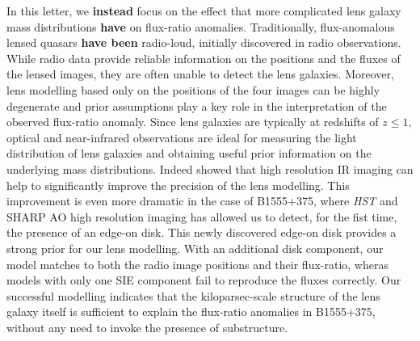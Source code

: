 \documentclass[useAMS,usenatbib]{mnras}
\begin{document}
In this letter, we \textbf{instead} focus on the effect that more complicated lens galaxy mass
distributions \textbf{have} on flux-ratio anomalies.
Traditionally, flux-anomalous lensed quasars \textbf{have been} radio-loud, initially discovered in radio observations. While radio data
provide reliable information on the positions and the fluxes of the
lensed images, they are often unable to detect the lens
galaxies. Moreover, lens modelling based only on the positions of the
four images can be highly degenerate and prior assumptions play a key
role in the interpretation of the observed flux-ratio anomaly.  Since
lens galaxies are typically at redshifts of $z \leq 1$, optical and
near-infrared observations are ideal for measuring the light distribution
of lens galaxies and obtaining useful prior information on the underlying
mass distributions. Indeed \citet{SHARP12} showed that high
resolution IR imaging can help to significantly improve the precision
of the lens modelling. This improvement is even more dramatic in the
case of B1555+375, where \textit{HST} and SHARP AO high resolution imaging has
allowed us to detect, for the fist time, the presence of an edge-on
disk. This newly discovered edge-on disk provides a strong prior for our
lens modelling.  With an additional disk component, our model 
matches to both the radio image positions and their flux-ratio, wheras
models with only one SIE component \citep{Marlow99,Xu14} fail to
reproduce the fluxes correctly. Our successful modelling indicates
that the kiloparsec-scale structure of the lens galaxy itself is
sufficient to explain the flux-ratio anomalies in B1555+375, without
any need to invoke the presence of substructure.
\end{document}
